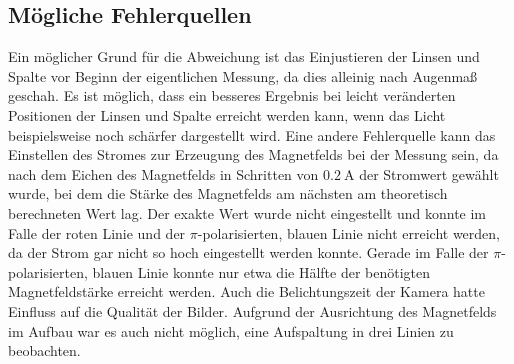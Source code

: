 \subsection{Mögliche Fehlerquellen}

    Ein möglicher Grund für die Abweichung ist das Einjustieren der Linsen und Spalte vor Beginn der eigentlichen Messung,
    da dies alleinig nach Augenmaß geschah.
    Es ist möglich,
    dass ein besseres Ergebnis bei leicht veränderten Positionen der Linsen und Spalte erreicht werden kann,
    wenn das Licht beispielsweise noch schärfer dargestellt wird.
    Eine andere Fehlerquelle kann das Einstellen des Stromes zur Erzeugung des Magnetfelds bei der Messung sein,
    da nach dem Eichen des Magnetfelds in Schritten von $\SI{0.2}{\ampere}$ der Stromwert gewählt wurde,
    bei dem die Stärke des Magnetfelds am nächsten am theoretisch berechneten Wert lag.
    Der exakte Wert wurde nicht eingestellt
    und konnte im Falle der roten Linie und der $\pi$-polarisierten, blauen Linie nicht erreicht werden,
    da der Strom gar nicht so hoch eingestellt werden konnte.
    Gerade im Falle der $\pi$-polarisierten, blauen Linie konnte nur etwa die Hälfte der benötigten Magnetfeldstärke erreicht werden.
    Auch die Belichtungszeit der Kamera hatte Einfluss auf die Qualität der Bilder.
    Aufgrund der Ausrichtung des Magnetfelds im Aufbau war es auch nicht möglich,
    eine Aufspaltung in drei Linien zu beobachten.
